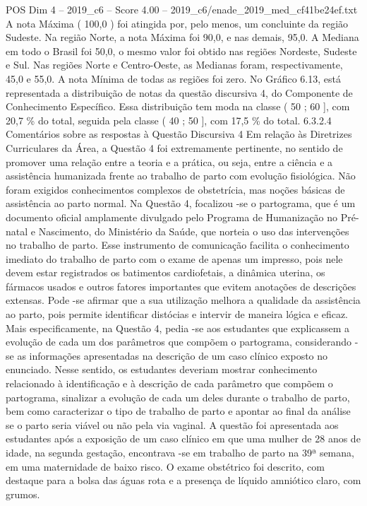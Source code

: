 \begin{textsample}{POS Dim 4 – 2019\_c6 – Score 4.00 – 2019\_c6/enade\_2019\_med\_cf41be24ef.txt}
A nota Máxima ( 100,0 ) foi atingida por, pelo menos, um concluinte da região Sudeste.
Na região Norte, a nota Máxima foi 90,0, e nas demais, 95,0.
A Mediana em todo o Brasil foi 50,0, o mesmo valor foi obtido nas regiões Nordeste, Sudeste e Sul.
Nas regiões Norte e Centro-Oeste, as Medianas foram, respectivamente, 45,0 e 55,0.
A nota Mínima de todas as regiões foi zero.
No Gráfico 6.13, está representada a distribuição de notas da questão discursiva 4, do Componente de Conhecimento Específico.
Essa distribuição tem moda na classe ( 50 ; 60 ], com 20,7 \% do total, seguida pela classe ( 40 ; 50 ], com 17,5 \% do total. 6.3.2.4 Comentários sobre as respostas à Questão Discursiva 4 Em relação às Diretrizes Curriculares da Área, a Questão 4 foi extremamente pertinente, no sentido de promover uma relação entre a teoria e a prática, ou seja, entre a ciência e a assistência humanizada frente ao trabalho de parto com evolução fisiológica.
Não foram exigidos conhecimentos complexos de obstetrícia, mas noções básicas de assistência ao parto normal.
Na Questão 4, focalizou -se o partograma, que é um documento oficial amplamente divulgado pelo Programa de Humanização no Pré-natal e Nascimento, do Ministério da Saúde, que norteia o uso das intervenções no trabalho de parto.
Esse instrumento de comunicação facilita o conhecimento imediato do trabalho de parto com o exame de apenas um impresso, pois nele devem estar registrados os batimentos cardiofetais, a dinâmica uterina, os fármacos usados e outros fatores importantes que evitem anotações de descrições extensas.
Pode -se afirmar que a sua utilização melhora a qualidade da assistência ao parto, pois permite identificar distócias e intervir de maneira lógica e eficaz.
Mais especificamente, na Questão 4, pedia -se aos estudantes que explicassem a evolução de cada um dos parâmetros que compõem o partograma, considerando -se as informações apresentadas na descrição de um caso clínico exposto no enunciado.
Nesse sentido, os estudantes deveriam mostrar conhecimento relacionado à identificação e à descrição de cada parâmetro que compõem o partograma, sinalizar a evolução de cada um deles durante o trabalho de parto, bem como caracterizar o tipo de trabalho de parto e apontar ao final da análise se o parto seria viável ou não pela via vaginal.
A questão foi apresentada aos estudantes após a exposição de um caso clínico em que uma mulher de 28 anos de idade, na segunda gestação, encontrava -se em trabalho de parto na 39ª semana, em uma maternidade de baixo risco.
O exame obstétrico foi descrito, com destaque para a bolsa das águas rota e a presença de líquido amniótico claro, com grumos.

\end{textsample}
